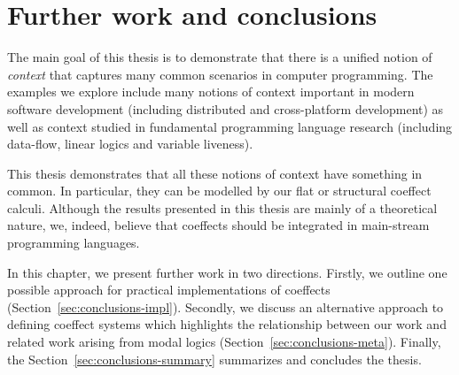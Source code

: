 
\chapter{Further work and conclusions} 
\label{ch:conclusions} 

The main goal of this thesis is to demonstrate that there is a unified notion of \emph{context}
that captures many common scenarios in computer programming. The examples we explore include
many notions of context important in modern software development (including distributed and
cross-platform development) as well as context studied in fundamental programming language 
research (including data-flow, linear logics and variable liveness).

This thesis demonstrates that all these notions of context have something in common. In 
particular, they can be modelled by our flat or structural coeffect calculi. Although the 
results presented in this thesis are mainly of a theoretical nature, we, indeed, believe that 
coeffects should be integrated in main-stream programming languages.

In this chapter, we present further work in two directions. Firstly, we outline one possible
approach for practical implementations of coeffects (Section~\ref{sec:conclusions-impl}). 
Secondly, we discuss an alternative approach to defining coeffect systems which highlights
the relationship between our work and related work arising from modal logics 
(Section~\ref{sec:conclusions-meta}). Finally, the Section~\ref{sec:conclusions-summary} summarizes
and concludes the thesis.



%                                                                   
%                                                                

